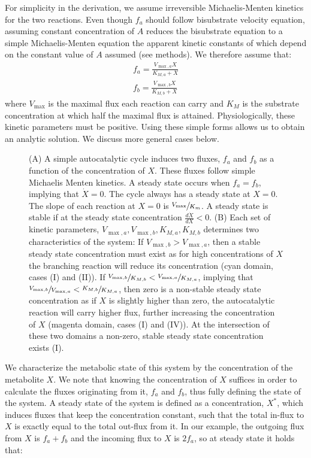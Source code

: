 For simplicity in the derivation, we assume irreversible Michaelis-Menten kinetics for the two reactions.
Even though $f_a$ should follow bisubstrate velocity equation, assuming constant concentration of $A$ reduces the bisubstrate equation to a simple Michaelis-Menten equation the apparent kinetic constants of which depend on the constant value of $A$ assumed (see methods).
We therefore assume that:
    \begin{eqnarray*}
      f_a = \frac{V_{\max,a}X}{K_{M,a}+X} \\
      f_b = \frac{V_{\max,b}X}{K_{M,b}+X}
    \end{eqnarray*}
    where $V_{\max}$ is the maximal flux each reaction can carry and $K_M$ is the substrate concentration at which half the maximal flux is attained.
    Physiologically, these kinetic parameters must be positive.
    Using these simple forms allows us to obtain an analytic solution.
    We discuss more general cases below.
    \begin{figure}[!htb]
      
      \caption{\label{fig:simplecycle}
        (A) A simple autocatalytic cycle induces two fluxes, $f_a$ and $f_b$ as a function of the concentration of $X$.
        These fluxes follow simple Michaelis Menten kinetics.
        A steady state occurs when $f_a=f_b$, implying that $\dot{X}=0$.
        The cycle always has a steady state at $X=0$.
        The slope of each reaction at $X=0$ is $\sfrac{V_{\max}}{K_m}$.
        A steady state is stable if at the steady state concentration $\frac{d\dot{X}}{dX}<0$.
        (B) Each set of kinetic parameters, $V_{\max,a},V_{\max,b},K_{M,a},K_{M,b}$ determines two characteristics of the system: 
        If $V_{\max,b}>V_{\max,a}$, then a stable steady state concentration must exist as for high concentrations of $X$ the branching reaction will reduce its concentration (cyan domain, cases (I) and (II)).
        If $\sfrac{V_{\max,b}}{K_{M,b}}<\sfrac{V_{\max,a}}{K_{M,a}}$, implying that $\sfrac{V_{\max,b}}{V_{\max,a}}<\sfrac{K_{M,b}}{K_{M,a}}$, then zero is a non-stable steady state concentration as if $X$ is slightly higher than zero, the autocatalytic reaction will carry higher flux, further increasing the concentration of $X$ (magenta domain, cases (I) and (IV)).
    At the intersection of these two domains a non-zero, stable steady state concentration exists (I).}
    \end{figure}

    We characterize the metabolic state of this system by the concentration of the metabolite $X$.
    We note that knowing the concentration of $X$ suffices in order to calculate the fluxes originating from it, $f_a$ and $f_b$, thus fully defining the state of the system.
    A steady state of the system is defined as a concentration, $X^*$, which induces fluxes that keep the concentration constant, such that the total in-flux to $X$ is exactly equal to the total out-flux from it.
    In our example, the outgoing flux from $X$ is $f_a+f_b$ and the incoming flux to $X$ is $2f_a$, so at steady state it holds that:

